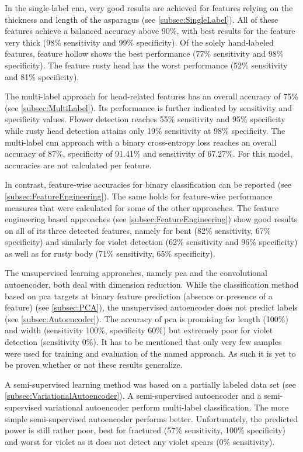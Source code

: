 \bigskip
In the single-label \acrshort{cnn}, very good results are achieved for features relying on the thickness and length of the asparagus (see \autoref{subsec:SingleLabel}). All of these features achieve a balanced accuracy above 90\%, with best results for the feature very thick (98\% sensitivity and 99\% specificity). Of the solely hand-labeled features, feature hollow shows the best performance (77\% sensitivity and 98\% specificity). The feature rusty head has the worst performance (52\% sensitivity and 81\% specificity).

The multi-label approach for head-related features has an overall accuracy of 75\% (see \autoref{subsec:MultiLabel}). Its performance is further indicated by sensitivity and specificity values. Flower detection reaches 55\% sensitivity and 95\% specificity while rusty head detection attains only 19\% sensitivity at 98\% specificity. The multi-label \acrshort{cnn} approach with a binary cross-entropy loss reaches an overall accuracy of 87\%, specificity of 91.41\% and sensitivity of 67.27\%. For this model, accuracies are not calculated per feature.

In contrast, feature-wise accuracies for binary classification can be reported (see \autoref{subsec:FeatureEngineering}). The same holds for feature-wise performance measures that were calculated for some of the other approaches. The feature engineering based approaches (see \autoref{subsec:FeatureEngineering}) show good results on all of its three detected features, namely for bent (82\% sensitivity, 67\% specificity) and similarly for violet detection (62\% sensitivity and 96\% specificity) as well as for rusty body (71\% sensitivity, 65\% specificity).

\bigskip
The unsupervised learning approaches, namely \acrshort{pca} and the convolutional autoencoder, both deal with dimension reduction. While the classification method based on \acrshort{pca} targets at binary feature prediction (absence or presence of a feature) (see \autoref{subsec:PCA}), the unsupervised autoencoder does not predict labels (see \autoref{subsec:Autoencoder}). The accuracy of \acrshort{pca} is promising for length (100\%) and width (sensitivity 100\%, specificity 60\%) but extremely poor for violet detection (sensitivity 0\%). It has to be mentioned that only very few samples were used for training and evaluation of the named approach. As such it is yet to be proven whether or not these results generalize.

\bigskip
A semi-supervised learning method was based on a partially labeled data set (see \autoref{subsec:VariationalAutoencoder}). A semi-supervised autoencoder and a semi-supervised variational autoencoder perform multi-label classification. The more simple semi-supervised autoencoder performs better. Unfortunately, the predicted power is still rather poor, best for fractured (57\% sensitivity, 100\% specificity) and worst for violet as it does not detect any violet spears (0\% sensitivity).

